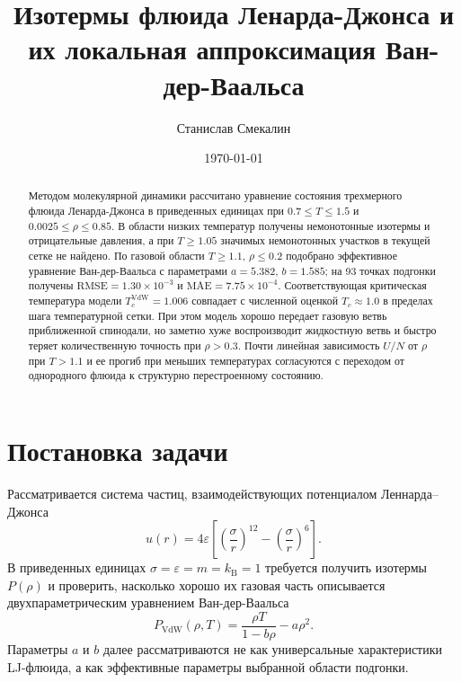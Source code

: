 \documentclass[
    aps,
    pre,
    floatfix,
    superscriptaddress,
    nofootinbib
]{revtex4-2}
\newcommand{\fitA}{5.382}
\newcommand{\fitB}{1.585}
\newcommand{\fitRMSE}{1.30\times10^{-3}}
\newcommand{\fitMAE}{7.75\times10^{-4}}
\newcommand{\fitN}{93}
\newcommand{\vdwTc}{1.006}
\begin{document}
\title{Изотермы флюида Ленарда-Джонса и их локальная аппроксимация Ван-дер-Ваальса}
\author{Станислав Смекалин}
\date{\today}

\begin{abstract}
Методом молекулярной динамики рассчитано уравнение состояния трехмерного
флюида Ленарда-Джонса в приведенных единицах при $0.7\leq T\leq1.5$ и
$0.0025\leq\rho\leq0.85$. В области низких температур получены немонотонные
изотермы и отрицательные давления, а при $T\geq1.05$ значимых немонотонных
участков в текущей сетке не найдено. По газовой области $T\geq1.1$, $\rho\leq0.2$
подобрано эффективное уравнение Ван-дер-Ваальса с параметрами
$a=\fitA$, $b=\fitB$; на \fitN{} точках подгонки получены
$\mathrm{RMSE}=\fitRMSE$ и $\mathrm{MAE}=\fitMAE$. Соответствующая критическая
температура модели $T_c^{\mathrm{VdW}}=\vdwTc$ совпадает с численной оценкой
$T_c\approx1.0$ в пределах шага температурной сетки. При этом модель хорошо
передает газовую ветвь приближенной спинодали, но заметно хуже воспроизводит
жидкостную ветвь и быстро теряет количественную точность при $\rho>0.3$.
Почти линейная зависимость $U/N$ от $\rho$ при $T>1.1$ и ее прогиб при меньших
температурах согласуются с переходом от однородного флюида к структурно
перестроенному состоянию.
\end{abstract}

\maketitle

\section{Постановка задачи}

Рассматривается система частиц, взаимодействующих потенциалом Леннарда--Джонса
\begin{equation}
    u(r)=4\varepsilon\left[\left(\frac{\sigma}{r}\right)^{12}
    -\left(\frac{\sigma}{r}\right)^6\right].
\end{equation}
В приведенных единицах $\sigma=\varepsilon=m=k_{\mathrm B}=1$ требуется получить
изотермы $P(\rho)$ и проверить, насколько хорошо их газовая часть описывается
двухпараметрическим уравнением Ван-дер-Ваальса
\begin{equation}
    P_{\mathrm{VdW}}(\rho,T)=\frac{\rho T}{1-b\rho}-a\rho^2 .
    \label{eq:vdw}
\end{equation}
Параметры $a$ и $b$ далее рассматриваются не как универсальные характеристики
LJ-флюида, а как эффективные параметры выбранной области подгонки.
\end{document}
